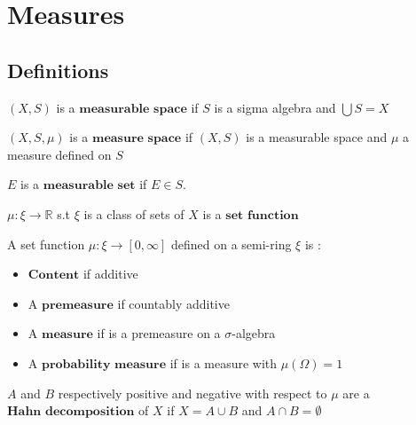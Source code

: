 \section{\LARGE Measures}

\subsection{Definitions}

$(X,S)$ is a $\textbf{measurable space}$ if $S$ is a sigma algebra and $\bigcup S = X$

$(X,S,\mu)$ is a $\textbf{measure space}$ if $(X,S)$ is a measurable space and $\mu$ a measure defined on $S$

$E$ is a $\textbf{measurable set}$ if $E\in S$.

$\mu : \xi \rightarrow \mathbb{R}$ s.t $\xi$ is a class of sets of $X$ is a $\textbf{set function}$

A set function $\mu : \xi \rightarrow [0, \infty]$ defined on a semi-ring $\xi$ is :

\begin{itemize}
\item $\textbf{Content}$ if additive
\item A $\textbf{premeasure}$ if countably additive
\item A $\textbf{measure}$ if is a premeasure on a $\sigma$-algebra
\item A $\textbf{probability measure}$ if is a measure with $\mu(\Omega) = 1$
\end{itemize}

$A$ and $B$ respectively positive and negative  with respect to $\mu$ are a $\textbf{Hahn decomposition}$ of $X$ if $X = A \cup B$ and $A \cap B = \emptyset$ 

